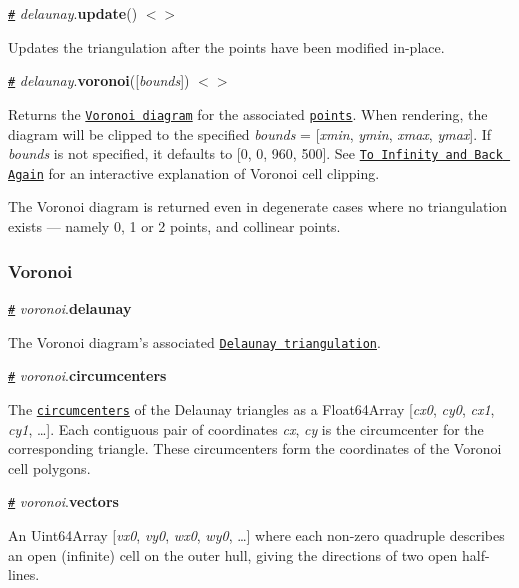 \href{#delaunay_update}{\tt \#} {\itshape delaunay}.{\bfseries update}() \href{https://github.com/d3/d3-delaunay/blob/master/src/delaunay.js}{\tt $<$$>$}

Updates the triangulation after the points have been modified in-\/place.

\href{#delaunay_voronoi}{\tt \#} {\itshape delaunay}.{\bfseries voronoi}(\mbox{[}{\itshape bounds}\mbox{]}) \href{https://github.com/d3/d3-delaunay/blob/master/src/delaunay.js}{\tt $<$$>$}

Returns the \href{#voronoi}{\tt Voronoi diagram} for the associated \href{#delaunay_points}{\tt points}. When rendering, the diagram will be clipped to the specified {\itshape bounds} = \mbox{[}{\itshape xmin}, {\itshape ymin}, {\itshape xmax}, {\itshape ymax}\mbox{]}. If {\itshape bounds} is not specified, it defaults to \mbox{[}0, 0, 960, 500\mbox{]}. See \href{https://observablehq.com/@mbostock/to-infinity-and-back-again}{\tt To Infinity and Back Again} for an interactive explanation of Voronoi cell clipping.

The Voronoi diagram is returned even in degenerate cases where no triangulation exists — namely 0, 1 or 2 points, and collinear points.

\subsubsection*{Voronoi}

\href{#voronoi_delaunay}{\tt \#} {\itshape voronoi}.{\bfseries delaunay}

The Voronoi diagram’s associated \href{#delaunay}{\tt Delaunay triangulation}.

\href{#voronoi_circumcenters}{\tt \#} {\itshape voronoi}.{\bfseries circumcenters}

The \href{http://mathworld.wolfram.com/Circumcenter.html}{\tt circumcenters} of the Delaunay triangles as a Float64\+Array \mbox{[}{\itshape cx0}, {\itshape cy0}, {\itshape cx1}, {\itshape cy1}, …\mbox{]}. Each contiguous pair of coordinates {\itshape cx}, {\itshape cy} is the circumcenter for the corresponding triangle. These circumcenters form the coordinates of the Voronoi cell polygons.

\href{#voronoi_vectors}{\tt \#} {\itshape voronoi}.{\bfseries vectors}

An Uint64\+Array \mbox{[}{\itshape vx0}, {\itshape vy0}, {\itshape wx0}, {\itshape wy0}, …\mbox{]} where each non-\/zero quadruple describes an open (infinite) cell on the outer hull, giving the directions of two open half-\/lines.

